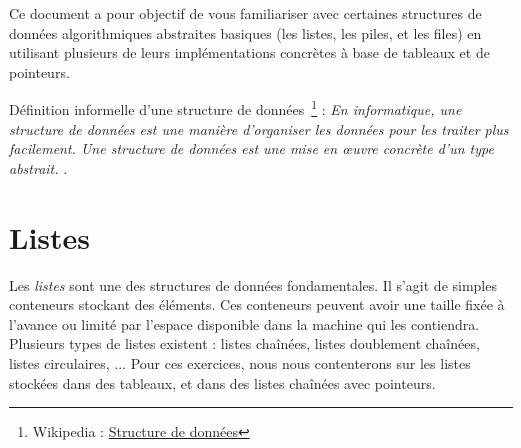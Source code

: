 \documentclass[11pt,a4paper]{article}
\begin{document}
\EncadreTitre

\bigskip


%
%

\bigskip


Ce document a pour objectif de vous familiariser avec certaines structures de données algorithmiques abstraites basiques (les listes, les piles, et les files) en utilisant plusieurs de leurs implémentations concrètes à base de tableaux et de pointeurs.

\bigskip

Définition informelle d'une structure de données~\footnote{Wikipedia : \href{https://fr.wikipedia.org/wiki/Structure_de_donn\%C3\%A9es}{Structure de données}} : \og \textit{En informatique, une structure de données est une manière d'organiser les données pour les traiter plus facilement. Une structure de données est une mise en œuvre concrète d'un type abstrait.} \fg .

\bigskip


\section{Listes}

\bigskip

Les \textit{listes} sont une des structures de données fondamentales.
Il s'agit de simples conteneurs stockant des éléments.
Ces conteneurs peuvent avoir une taille fixée à l'avance ou limité par l'espace disponible dans la machine qui les contiendra.
Plusieurs types de listes existent : listes chaînées, listes doublement chaînées, listes circulaires, ...
Pour ces exercices, nous nous contenterons sur les listes stockées dans des tableaux, et dans des listes chaînées avec pointeurs.
\end{document}
